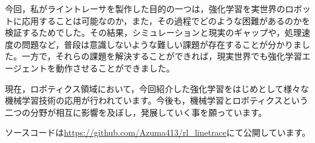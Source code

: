 \documentclass{jsbook}
\numberwithin{equation}{section}
\begin{document}
今回，私がライントレーサを製作した目的の一つは，強化学習を実世界のロボットに応用することは可能なのか，また，その過程でどのような困難があるのかを検証するためでした。その結果，シミュレーションと現実のギャップや，処理速度の問題など，普段は意識しないような難しい課題が存在することが分かりました。一方で，それらの課題を解決することができれば，現実世界でも強化学習エージェントを動作させることができました。

現在，ロボティクス領域において，今回紹介した強化学習をはじめとして様々な機械学習技術の応用が行われています。今後も，機械学習とロボティクスという二つの分野が相互に影響を及ぼし，発展していく事を願っています。

ソースコードは\url{https://github.com/Azuma413/rl_linetrace}にて公開しています。



\end{document}

